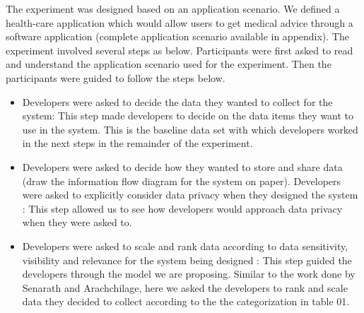 \documentclass{sigchi}
\begin{document}
The experiment was designed based on an application scenario. We defined a health-care application which would allow users to get medical advice through a software application (complete application scenario available in appendix). The experiment involved several steps as below. Participants were first asked to read and understand the application scenario used for the experiment. Then the participants were guided to follow the steps below.

\begin{itemize}
\item Developers were asked to decide the data they wanted to collect for the system:  This step made developers to decide on the data items they want to use in the system. This is the baseline data set with which developers worked in the next steps in the remainder of the experiment.
\item Developers were asked to decide how they wanted to store and share data (draw the information flow diagram for the system on paper). Developers were asked to explicitly consider data privacy when they designed the system : This step allowed us to see how developers would approach data privacy when they were asked to.
\item Developers were asked to scale and rank data according to data sensitivity, visibility and relevance for the system being designed : This step guided the developers through the model we are proposing. Similar to the work done by Senarath and Arachchilage, here we asked the developers to rank and scale data they decided to collect according to the the categorization in table 01. 


\end{itemize}
\end{document}
